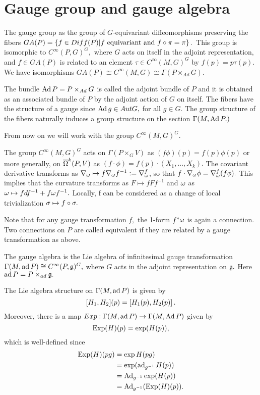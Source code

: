 \section{Gauge group and gauge algebra}

The gauge group as the group of $G$-equivariant diffeomorphisms preserving the fibers $GA(P)=\left\{ f \in Diff(P)|
f\text{ equivariant and }f \circ \pi =\pi \right\}.$ This group is isomorphic to $C^{\infty}(P, G)^{G},$ where $G$ acts on
itself in the adjoint representation, and $f \in GA(P)$ is related to an element $\tau \in C^{\infty}(M, G)^{G}$ by
$f(p)=p\tau(p).$ We have isomorphisms $GA(P) \cong C^{\infty}(M, G) \cong \Gamma( P \times_{Ad} G).$

The bundle $\operatorname{Ad} P = P\times_{Ad}G $ is called the adjoint bundle of $P$ and it is obtained as an associated bundle
of $P$ by the adjoint action of $G$ on itself. The fibers have the structure of a gauge since $\operatorname{Ad} g \in Aut G,$
for all $g \in G.$ The group structure of the fibers naturally induces a group structure on the section $\Gamma(M,
\operatorname{Ad}P.)$

From now on we will work with the group $C^{\infty}(M, G)^{G}.$

The group $C^{\infty}(M, G)^{G}$ acts on $\Gamma(P \times_{G} V)$ as $(f\phi)(p)=f(p)\phi(p)$ or more generally, on
$\overline{\Omega}^{k}(P, V)$ as $(f\cdot \phi)=f(p)\cdot (X_{1},...,X_{k}).$ The covariant derivative transforms as $\nabla_{\omega} \mapsto
f \nabla_{\omega}f^{-1}:=\nabla_{\omega}^{f}$, so that $f \cdot \nabla_{\omega}\phi = \nabla_{\omega}^{f}(f \phi).$ This implies that the
curvature transforms as $F \mapsto f F f^{-1}$ and $\omega$ as $\omega \mapsto f df^{-1}+ f \omega f^{-1}.$ Locally, f can be
considered as a change of local trivialization $\sigma \mapsto f \circ \sigma.$

Note that for any gauge transformation $f,$ the 1-form $f^{*}\omega$ is again a connection. Two connections on $P$ are
called equivalent if they are related by a gauge transformation as above.

\begin{defn}
 \label{JB:6.1}
The gauge algebra is the Lie algebra of infinitesimal gauge transformation $\Gamma(M, \operatorname{ad}P) \cong C^{\infty}(P,
\mathfrak{g})^{G},$ where $G$ acts in the adjoint representation on $\mathfrak{g}.$ Here $\operatorname{ad} P = P \times_{ad} \mathfrak{g}.$
\end{defn}

The Lie algebra structure on $\Gamma(M, \operatorname{ad} P)$ is given by $$[H_{1}, H_{2}](p)=\left[H_{1}(p),H_{2}(p)\right].$$
Moreover, there is a map $Exp: \Gamma(M, \operatorname{ad} P) \to \Gamma(M, \operatorname{Ad} P)$ given by
$$
\operatorname{Exp}(H)(p)=\exp(H(p)),
$$
which is well-defined since
\begin{align*}
\operatorname{Exp}(H)(pg) &= \exp H (pg) \\
&=\exp(\operatorname{ad}_{g^{-1}}H(p)) \\
&=\operatorname{Ad}_{g^{-1}}\exp (H(p)) \\
&=\operatorname{Ad}_{g^{-1}}(\operatorname{Exp}(H)(p)). 
\end{align*}

